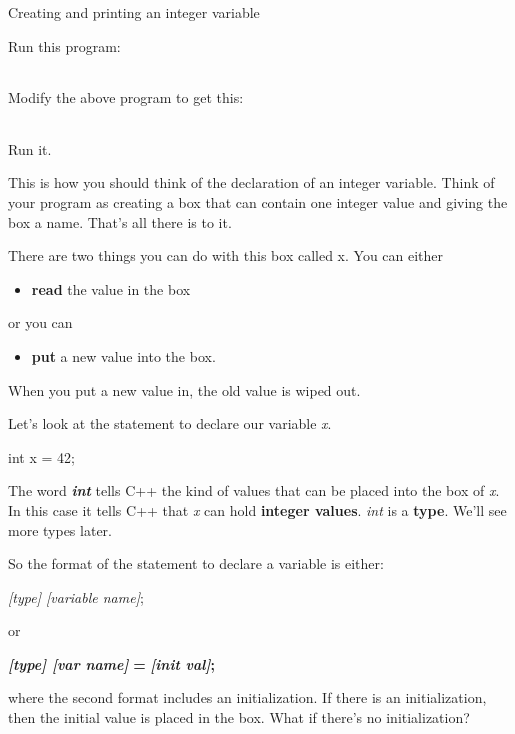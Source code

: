\documentclass[
]{article}
\providecommand{\tightlist}{%
  \setlength{\itemsep}{0pt}\setlength{\parskip}{0pt}}
\begin{document}
Creating and printing an integer variable

Run this program:

\begin{longtable}[]{@{}@{}}
\toprule
\endhead
\bottomrule
\end{longtable}

Modify the above program to get this:

\begin{longtable}[]{@{}@{}}
\toprule
\endhead
\bottomrule
\end{longtable}

Run it.

This is how you should think of the declaration of an integer variable.
Think of your program as creating a box that can contain one integer
value and giving the box a name. That's all there is to it.

There are two things you can do with this box called x. You can either

\begin{itemize}
\tightlist
\item
  \textbf{read} the value in the box
\end{itemize}

or you can

\begin{itemize}
\tightlist
\item
  \textbf{put} a new value into the box.
\end{itemize}

When you put a new value in, the old value is wiped out.

Let's look at the statement to declare our variable \emph{x}.

int x = 42;

The word \emph{\textbf{int}} tells C++ the kind of values that can be
placed into the box of \emph{x}. In this case it tells C++ that \emph{x}
can hold \textbf{integer values}. \emph{int} is a \textbf{type}. We'll
see more types later.

So the format of the statement to declare a variable is either:

\emph{{[}type{]} {[}variable name{]}};

or

\emph{\textbf{ }\textbf{{[}type{]} {[}var name{]}}}\textbf{ =
}\emph{\textbf{{[}init val{]}}}\textbf{;}

where the second format includes an initialization. If there is an
initialization, then the initial value is placed in the box. What if
there's no initialization?
\end{document}
